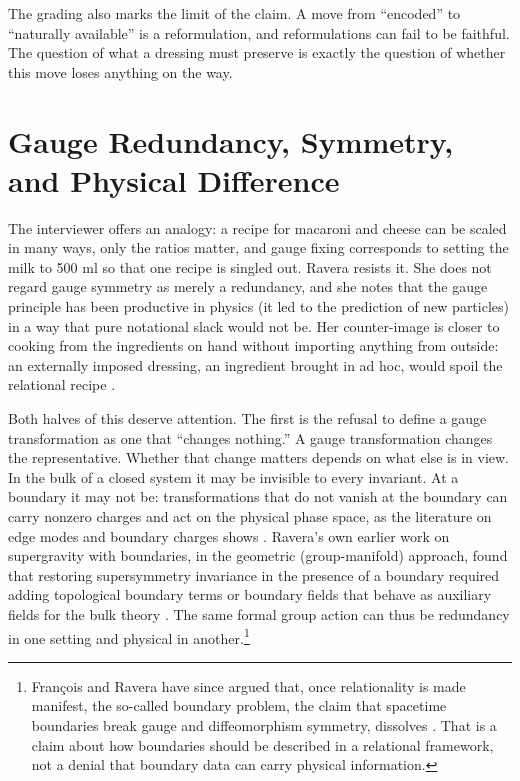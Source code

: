 \documentclass[11pt]{article}
\theoremstyle{plain}
\theoremstyle{definition}
\theoremstyle{remark}
\begin{document}
The grading also marks the limit of the claim. A move from ``encoded'' to ``naturally available'' is a reformulation, and reformulations can fail to be faithful. The question of what a dressing must preserve is exactly the question of whether this move loses anything on the way.

\section{Gauge Redundancy, Symmetry, and Physical Difference}\label{sec:redundancy}

The interviewer offers an analogy: a recipe for macaroni and cheese can be scaled in many ways, only the ratios matter, and gauge fixing corresponds to setting the milk to 500 ml so that one recipe is singled out. Ravera resists it. She does not regard gauge symmetry as merely a redundancy, and she notes that the gauge principle has been productive in physics (it led to the prediction of new particles) in a way that pure notational slack would not be. Her counter-image is closer to cooking from the ingredients on hand without importing anything from outside: an externally imposed dressing, an ingredient brought in ad hoc, would spoil the relational recipe \cite{toe}.

Both halves of this deserve attention. The first is the refusal to define a gauge transformation as one that ``changes nothing.'' A gauge transformation changes the representative. Whether that change matters depends on what else is in view. In the bulk of a closed system it may be invisible to every invariant. At a boundary it may not be: transformations that do not vanish at the boundary can carry nonzero charges and act on the physical phase space, as the literature on edge modes and boundary charges shows \cite{donnelly-freidel}. Ravera's own earlier work on supergravity with boundaries, in the geometric (group-manifold) approach, found that restoring supersymmetry invariance in the presence of a boundary required adding topological boundary terms or boundary fields that behave as auxiliary fields for the bulk theory \cite{andrianopoli-ravera}. The same formal group action can thus be redundancy in one setting and physical in another.\footnote{François and Ravera have since argued that, once relationality is made manifest, the so-called boundary problem, the claim that spacetime boundaries break gauge and diffeomorphism symmetry, dissolves \cite{fr-mech}. That is a claim about how boundaries should be described in a relational framework, not a denial that boundary data can carry physical information.}
\end{document}
